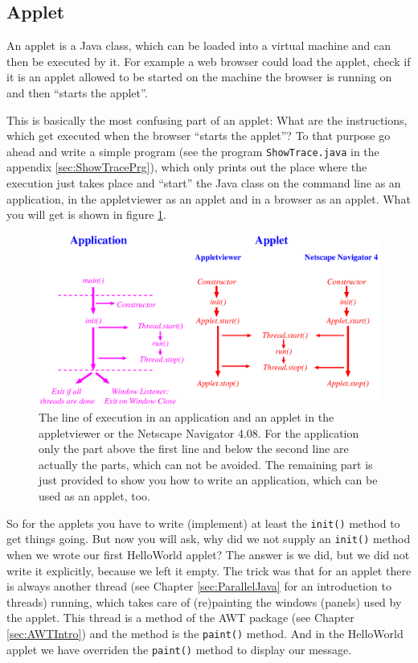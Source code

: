 \subsection{Applet}
An applet is a Java class, which can be loaded into a virtual machine
and can then be executed by it. 
For example a web browser could load
the applet, check if it is an applet allowed to be started on the
machine the browser is running on and then ``starts the applet''.

This is basically the most confusing part of an applet: What are the
instructions, which get executed when the browser ``starts the applet''?
To that purpose go ahead and write a simple program 
(see the program \verb|ShowTrace.java| in the appendix \ref{sec:ShowTracePrg}),
 which only 
prints out the place where the execution just takes place and ``start''
the Java class on the command line as an application, in the appletviewer
as an applet and in a browser as an applet. What you will get is shown
in figure \ref{fig:LineOfExecution}.
\begin{figure}[htbp]
  \begin{center}
    \leavevmode
    \includegraphics[width=\textwidth]{Figures/LineOfExecution.eps}
    \caption{The line of execution in an application and an applet in
        the appletviewer or the Netscape Navigator 4.08. For the application
        only the part above the first line and below the second line are
        actually the parts, which can not be avoided. The remaining
        part is just provided to show you how to write an application,
        which can be used as an applet, too.}
    \label{fig:LineOfExecution}
  \end{center}
\end{figure}

So for the applets you have to write (implement) at least the 
\verb|init()| method to get things going. But now you will ask, why did we
not supply an  \verb|init()| method when we wrote our first 
HelloWorld applet? The answer is we did, but we did not write it explicitly,
because we left it empty. The trick was that for an applet there is
always another thread (see 
Chapter \ref{sec:ParallelJava} for an introduction to threads)
running, which takes care of (re)painting the windows (panels) used by the applet.
This thread is a method of the AWT package (see Chapter \ref{sec:AWTIntro}) and
the method is the \verb|paint()| method. And in the    HelloWorld applet
we have overriden the \verb|paint()| method to display our message.

